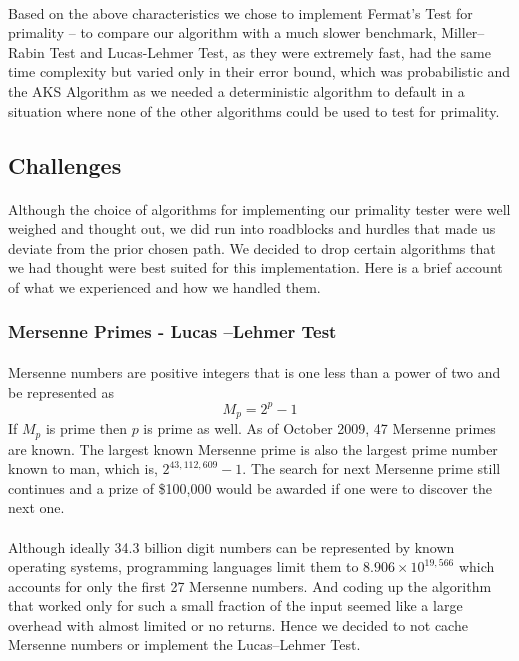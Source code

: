 \documentclass[paper=a4, fontsize=11pt]{scrartcl}	%
\numberwithin{equation}{section}		%
\numberwithin{figure}{section}		%
\numberwithin{table}{section}		%
\begin{document}
\paragraph{}Based on the above characteristics we chose to implement Fermat's Test for primality -- to compare our algorithm with a much slower benchmark, Miller--Rabin Test and Lucas-Lehmer Test, as they were extremely fast, had the same time complexity but varied only in their error bound, which was probabilistic and the AKS Algorithm as we needed a deterministic algorithm to default in a situation where none of the other algorithms could be used to test for primality.

\subsection{Challenges}
\paragraph{}Although the choice of algorithms for implementing our primality tester were well weighed and thought out, we did run into roadblocks and hurdles that made us deviate from the prior chosen path. We decided to drop certain algorithms that we had thought were best suited for this implementation. Here is a brief account of what we experienced and how we handled them.

\subsubsection{Mersenne Primes - Lucas --Lehmer Test}
\paragraph{}Mersenne numbers are positive integers that is one less than a power of two and be represented as
\[M_p = 2^p -1\] If $M_p$ is prime then $p$ is prime as well. As of October 2009, 47 Mersenne primes are known. The largest known Mersenne prime is also the largest prime number known to man, which is, $2^{43,112,609}-1$. The search for next Mersenne prime still continues and a prize of \$100,000 would be awarded if one were to discover the next one. 
\paragraph{}Although ideally 34.3 billion digit numbers can be represented by known operating systems, programming languages limit them to $8.906 \times 10^{19,566}$ which accounts for only the first 27 Mersenne numbers. And coding up the algorithm that worked only for such a small fraction of the input seemed like a large overhead with almost limited or no returns. Hence we decided to not cache Mersenne numbers or implement the Lucas--Lehmer Test.
\end{document}
